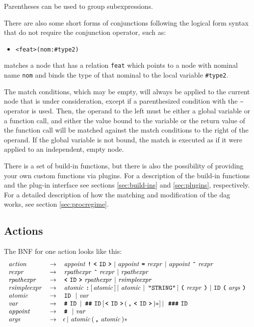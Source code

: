 \documentclass[11pt,a4paper]{article}
\newcommand{\cd}[1]{\texttt{#1}}
\begin{document}
Parentheses can be used to group subexpressions.

There are also some short forms of conjunctions following the logical form
syntax that do not require the conjunction operator, such as:

\begin{itemize}
\item[] \cd{<feat>(nom:\#type2)}
\end{itemize}
matches a node that has a relation \cd{feat} which points to a node with
nominal name \cd{nom} and binds the type of that nominal to the local variable
\cd{\#type2}.

The match conditions, which may be empty, will always be applied to the current
node that is under consideration, except if a parenthesized condition with the
\textbf{\~} operator is used. Then, the operand to the left must be either a
global variable or a function call, and either the value bound to the variable
or the return value of the function call will be matched against the match
conditions to the right of the operand. If the global variable is not bound,
the match is executed as if it were applied to an independent, empty node.

There is a set of build-in functions, but there is also the possibility of
providing your own custom functions via plugins. For a description of the
build-in functions and the plug-in interface see sections \ref{sec:build-ins}
and \ref{sec:plugins}, respectively. For a detailed description of how the
matching and modification of the dag works, see section \ref{sec:procregime}.

\newpage

\subsection{Actions}

The BNF for one action looks like this:
\[
\begin{array}{lcl}
\nt{action} & \rightarrow & \nt{appoint} \tok{!} \tok{<}\id \tok{>} \BAR
\nt{appoint} \tok{=} \nt{rexpr} \BAR  \nt{appoint} \tok{\^{}} \nt{rexpr}\\
\nt{rexpr} & \rightarrow &
  \nt{rpathexpr} \tok{\^{}} \nt{rexpr} \BAR
  \nt{rpathexpr}\\
\nt{rpathexpr} & \rightarrow &
  \tok{<}\id \tok{>} \nt{rpathexpr} \BAR
  \nt{rsimpleexpr}\\
\nt{rsimpleexpr} & \rightarrow &
  \nt{atomic} \tok{:} [ \nt{atomic} ] \BAR
  \nt{atomic} \BAR \ \verb$"STRING"$  \BAR
  \tok{(} \nt{rexpr} \tok{)} \BAR
  \id\tok{(}\nt{args}\tok{)}\\
\nt{atomic} & \rightarrow & \id \ \BAR \nt{var}\\
\nt{var} & \rightarrow &
  \tok{\#}\id \ \mbox{\textbar}
  \ \tok{\#\#}\id [ \tok{<}\id \tok{>} ( \tok{,} \tok{<}\id \tok{>} )* ] \BAR
  \ \tok{\#\#\#}\id \\
\nt{appoint} & \rightarrow & \tok{\#}  \ \BAR \nt{var}\\
\nt{args} & \rightarrow & \epsilon
  \BAR \nt{atomic} (\tok{,} \nt{atomic})*
\end{array}
\]
\end{document}
